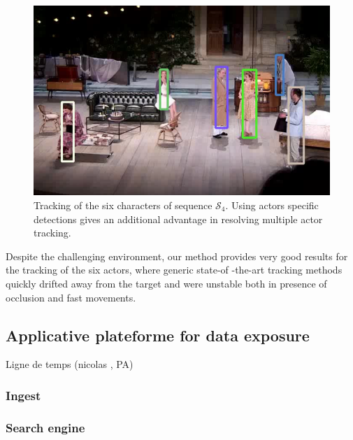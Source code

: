 \documentclass[conference]{IEEEtran}
\begin{document}
\begin{figure}[tp]
\centering
\includegraphics[width=\columnwidth]{tracking_coahtr}
\caption{Tracking of  the six characters of sequence $\mathcal{S}_4$. Using actors specific detections gives 
an additional advantage in resolving multiple actor tracking.}
\label{fig_tracking_coahtr}
\end{figure}

Despite the challenging environment, our method provides very good results for the tracking of the six actors, where generic state-of -the-art tracking methods quickly drifted away from the target  and were unstable both in presence of occlusion and fast movements. 





\subsection{Applicative plateforme for data exposure}
Ligne de temps (nicolas , PA)

\subsubsection{Ingest}

\subsubsection{Search engine}
\end{document}
